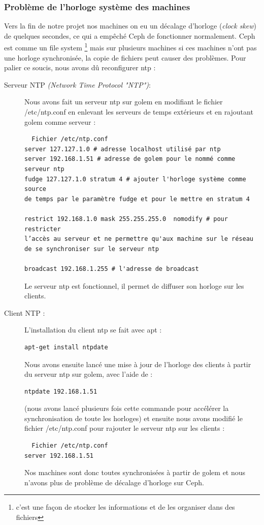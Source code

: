 \documentclass[12pt]{article}
\begin{document}
	\subsubsection{Problème de l'horloge système des machines}
Vers la fin de notre projet nos machines on eu un décalage d'horloge (\textit{clock skew}) de quelques secondes, ce qui a empêché Ceph de fonctionner normalement. Ceph est comme un file system \footnote{c'est une façon de stocker les informations et de les organiser dans des fichiers} mais sur plusieurs machines si ces machines n'ont pas une horloge synchronisée, la copie de fichiers peut causer des problèmes. Pour palier ce soucis, nous avons dû reconfigurer ntp :
\begin{description}
\item[Serveur NTP \textit{(Network Time Protocol "NTP")}:] 
Nous avons fait un serveur ntp sur golem en modifiant le fichier /etc/ntp.conf en enlevant les serveurs de temps extérieurs et en rajoutant golem comme serveur :

\begin{verbatim}
  Fichier /etc/ntp.conf
server 127.127.1.0 # adresse localhost utilisé par ntp
server 192.168.1.51 # adresse de golem pour le nommé comme serveur ntp
fudge 127.127.1.0 stratum 4 # ajouter l'horloge système comme source 
de temps par le paramètre fudge et pour le mettre en stratum 4

restrict 192.168.1.0 mask 255.255.255.0  nomodify # pour restricter
l’accès au serveur et ne permettre qu'aux machine sur le réseau
de se synchroniser sur le serveur ntp

broadcast 192.168.1.255 # l'adresse de broadcast 
\end{verbatim}

Le serveur ntp est fonctionnel, il permet de diffuser son horloge sur les clients.
\item [Client NTP :]
L'installation du client ntp se fait avec apt :
\begin{verbatim}
apt-get install ntpdate
\end{verbatim}

Nous avons ensuite lancé une mise à jour de l'horloge des clients à partir du serveur ntp sur golem, avec l'aide de :
\begin{verbatim}
ntpdate 192.168.1.51
\end{verbatim}
 (nous avons lancé plusieurs fois cette commande pour accélérer la synchronisation de toute les horloges)
et ensuite nous avons modifié le fichier /etc/ntp.conf pour rajouter le serveur ntp sur les clients :
\begin{verbatim}
  Fichier /etc/ntp.conf
server 192.168.1.51 
\end{verbatim}

Nos machines sont donc toutes synchronisées à partir de golem et nous n'avons plus de problème de décalage d'horloge sur Ceph.
\end{description}
\end{document}
